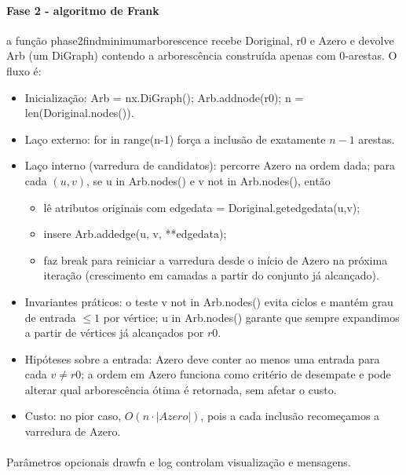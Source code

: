 \documentclass[12pt,a4paper]{article}
\def\texttt#1{#1}%
\def\emph#1{#1}%
\def\_{}%
\begin{document}
\paragraph{Fase 2 - algoritmo de Frank}
	a função \texttt{phase2\_find\_minimum\_arborescence} recebe \texttt{D\_original}, \texttt{r0} e \texttt{A\_zero} e devolve \texttt{Arb} (um \texttt{DiGraph}) contendo a arborescência construída apenas com 0‑arestas. O fluxo é:
\begin{itemize}\setlength{\itemsep}{1pt}
    \item \emph{Inicialização:} \texttt{Arb = nx.DiGraph(); Arb.add\_node(r0); n = len(D\_original.nodes())}.
    \item \emph{Laço externo:} \texttt{for \_ in range(n-1)} força a inclusão de exatamente \(n-1\) arestas.
    \item \emph{Laço interno (varredura de candidatos):} percorre \texttt{A\_zero} na ordem dada; para cada \((u,v)\), se \texttt{u in Arb.nodes()} e \texttt{v not in Arb.nodes()}, então
    \begin{itemize}\setlength{\itemsep}{1pt}
        \item lê atributos originais com \texttt{edge\_data = D\_original.get\_edge\_data(u,v)};
        \item insere \texttt{Arb.add\_edge(u, v, **edge\_data)};
        \item faz \texttt{break} para reiniciar a varredura desde o início de \texttt{A\_zero} na próxima iteração (crescimento em camadas a partir do conjunto já alcançado).
    \end{itemize}
    \item \emph{Invariantes práticos:} o teste \texttt{v not in Arb.nodes()} evita ciclos e mantém grau de entrada \(\le 1\) por vértice; \texttt{u in Arb.nodes()} garante que sempre expandimos a partir de vértices já alcançados por \(r0\).
    \item \emph{Hipóteses sobre a entrada:} \texttt{A\_zero} deve conter ao menos uma entrada para cada \(v\neq r0\); a ordem em \texttt{A\_zero} funciona como critério de desempate e pode alterar qual arborescência ótima é retornada, sem afetar o custo.
    \item \emph{Custo:} no pior caso, \(O(n\cdot |A\_zero|)\), pois a cada inclusão recomeçamos a varredura de \texttt{A\_zero}.
\end{itemize}

\paragraph{}
Parâmetros opcionais \texttt{draw\_fn} e \texttt{log} controlam visualização e mensagens.
\end{document}
